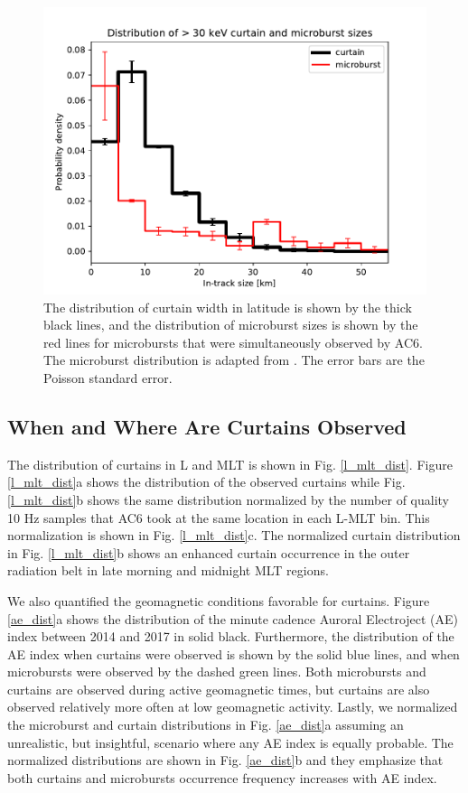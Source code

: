 \documentclass[draft]{agujournal2019}
\begin{document}
\begin{figure}
\includegraphics[width=\textwidth]{ac6_curtain_microburst_width_dist.pdf}
\caption{The distribution of curtain width in latitude is shown by the thick black lines, and the distribution of microburst sizes is shown by the red lines for microbursts that were simultaneously observed by AC6. The microburst distribution is adapted from . The error bars are the Poisson standard error.}
\label{width_dist}
\end{figure}

\subsection{When and Where Are Curtains Observed}
The distribution of curtains in L and MLT is shown in Fig. \ref{l_mlt_dist}. Figure \ref{l_mlt_dist}a shows the distribution of the observed curtains while Fig. \ref{l_mlt_dist}b shows the same distribution normalized by the number of quality 10 Hz samples that AC6 took at the same location in each L-MLT bin. This normalization is shown in Fig. \ref{l_mlt_dist}c. The normalized curtain distribution in Fig. \ref{l_mlt_dist}b shows an enhanced curtain occurrence in the outer radiation belt in late morning and midnight MLT regions.

We also quantified the geomagnetic conditions favorable for curtains. Figure \ref{ae_dist}a shows the distribution of the minute cadence Auroral Electroject (AE) index between 2014 and 2017 in solid black. Furthermore, the distribution of the AE index when curtains were observed is shown by the solid blue lines, and when microbursts were observed by the dashed green lines. Both microbursts and curtains are observed during active geomagnetic times, but curtains are also observed relatively more often at low geomagnetic activity. Lastly, we normalized the microburst and curtain distributions in Fig. \ref{ae_dist}a assuming an unrealistic, but insightful, scenario where any AE index is equally probable. The normalized distributions are shown in Fig. \ref{ae_dist}b and they emphasize that both curtains and microbursts occurrence frequency increases with AE index.
\end{document}
